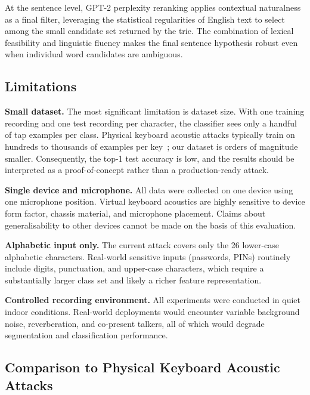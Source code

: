 \documentclass[conference]{IEEEtran}
\begin{document}
At the sentence level, GPT-2 perplexity reranking applies
contextual naturalness as a final filter, leveraging the
statistical regularities of English text to select among the small
candidate set returned by the trie.
The combination of lexical feasibility and linguistic fluency makes
the final sentence hypothesis robust even when individual word
candidates are ambiguous.

\subsection{Limitations}

\textbf{Small dataset.}
The most significant limitation is dataset size.
With one training recording and one test recording per character,
the classifier sees only a handful of tap examples per class.
Physical keyboard acoustic attacks typically train on hundreds to
thousands of examples per key~\cite{harrison2023deep}; our dataset
is orders of magnitude smaller.
Consequently, the top-1 test accuracy is low, and the results
should be interpreted as a proof-of-concept rather than a
production-ready attack.

\textbf{Single device and microphone.}
All data were collected on one device using one microphone position.
Virtual keyboard acoustics are highly sensitive to device form
factor, chassis material, and microphone placement.
Claims about generalisability to other devices cannot be made on
the basis of this evaluation.

\textbf{Alphabetic input only.}
The current attack covers only the 26 lower-case alphabetic
characters.
Real-world sensitive inputs (passwords, PINs) routinely include
digits, punctuation, and upper-case characters, which require a
substantially larger class set and likely a richer feature
representation.

\textbf{Controlled recording environment.}
All experiments were conducted in quiet indoor conditions.
Real-world deployments would encounter variable background noise,
reverberation, and co-present talkers, all of which would degrade
segmentation and classification performance.

\subsection{Comparison to Physical Keyboard Acoustic Attacks}
\end{document}
